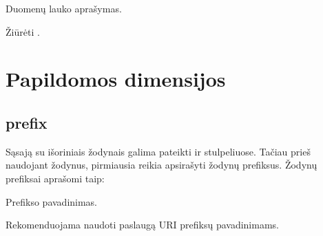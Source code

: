 \documentclass[letterpaper,10pt,lithuanian]{sphinxmanual}
\begin{document}

\begin{fulllineitems}
\label{\detokenize{dimensijos:property.description}}
\pysigstartsignatures
{}
\pysigstopsignatures
\sphinxAtStartPar
Duomenų lauko aprašymas.

\end{fulllineitems}


\begin{fulllineitems}
\label{\detokenize{dimensijos:property.enum}}
\pysigstartsignatures
{}
\pysigstopsignatures
\sphinxAtStartPar
Žiūrėti {\hyperref[\detokenize{dimensijos:enum}]{}}.

\end{fulllineitems}



\section{Papildomos dimensijos}
\label{\detokenize{dimensijos:papildomos-dimensijos}}\label{\detokenize{dimensijos:id8}}

\subsection{prefix}
\label{\detokenize{dimensijos:prefix}}\label{\detokenize{dimensijos:id9}}\label{\detokenize{dimensijos:module-prefix}}
\sphinxAtStartPar
Sąsają su išoriniais žodynais galima pateikti {\hyperref[\detokenize{dimensijos:model.uri}]{}} ir
{\hyperref[\detokenize{dimensijos:property.uri}]{}} stulpeliuose. Tačiau prieš naudojant žodynus, pirmiausia
reikia apsirašyti žodynų prefiksus. Žodynų prefiksai aprašomi taip:

\begin{fulllineitems}
\label{\detokenize{dimensijos:prefix.ref}}
\pysigstartsignatures
{}
\pysigstopsignatures
\sphinxAtStartPar
Prefikso pavadinimas.

\sphinxAtStartPar
Rekomenduojama naudoti  paslaugą URI prefiksų pavadinimams.

\end{fulllineitems}
\end{document}
